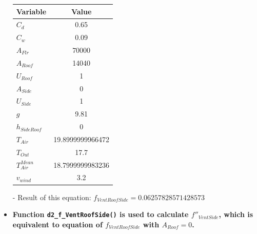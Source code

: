\documentclass[a4paper]{article}
\numberwithin{equation}{section}
\begin{document}
\begin{itemize}
        \begin{table}[H]
          \centering
          \begin{tabular}{@{}lS[table-format=5.13]@{}}
            \toprule
            \textbf{Variable}  & \textbf{Value}   \\
            \midrule
            \(C_d\)            & 0.65             \\
            \(C_w\)            & 0.09             \\
            \(A_{Flr}\)        & 70000            \\
            \(A_{Roof}\)       & 14040            \\
            \(U_{Roof}\)       & 1                \\
            \(A_{Side}\)       & 0                \\
            \(U_{Side}\)       & 1                \\
            \(g\)              & 9.81             \\
            \(h_{SideRoof}\)   & 0                \\
            \(T_{Air}\)        & 19.8999999966472 \\
            \(T_{Out}\)        & 17.7             \\
            \(T_{Air}^{Mean}\) & 18.7999999983236 \\
            \(v_{wind}\)       & 3.2              \\
            \bottomrule
          \end{tabular}
        \end{table}

  \item[-] Result of this equation: \(f_{VentRoofSide} = 0.06257828571428573\)

  \item \textbf{Function \texttt{d2\_f\_VentRoofSide()} is used to calculate \(f''_{VentSide}\), which is equivalent to equation of \(f_{VentRoofSide}\) with \(A_{Roof} = 0\).}


\end{itemize}
\end{document}
